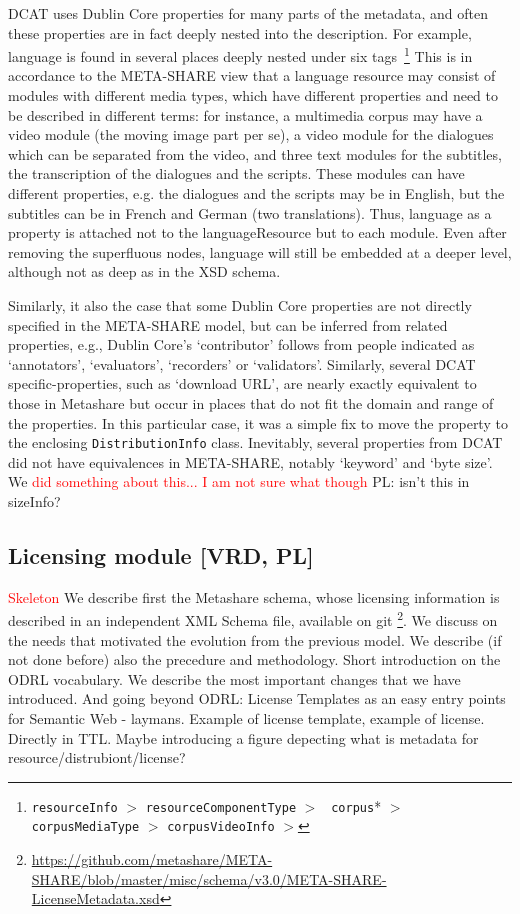 \documentclass{llncs}
\begin{document}
{DCAT uses Dublin Core properties for many parts of the metadata, and often these
properties are in fact deeply nested into the description. For example, language
is found in several places deeply nested under six
tags~\footnote{{\tt resourceInfo} $>$ {\tt resourceComponentType} $>$ {\tt
corpus}* $>$ {\tt corpusMediaType} $>$ {\tt corpusVideoInfo} $>$ {\tt}}
This is in accordance to the META-SHARE view that a language resource may consist of modules with different media types, which have different properties and need to be described in different terms: for instance, a multimedia corpus may have a video module (the moving image part per se), a video module for the dialogues which can be separated from the video, and three text modules for the subtitles, the transcription of the dialogues and the scripts. These modules can have different properties, e.g. the dialogues and the scripts may be in English, but the subtitles can be in French and German (two translations). Thus, language as a property is attached not to the languageResource but to each module. Even after removing the superfluous nodes, language will still be embedded at a deeper level, although not as deep as in the XSD schema.


Similarly, it also the case that some Dublin Core properties are not directly
specified in the META-SHARE model, but can be inferred from related properties,
e.g., Dublin Core's `contributor' follows from people indicated as `annotators',
`evaluators', `recorders' or `validators'. Similarly, several DCAT specific-properties, such as `download URL', are nearly
exactly equivalent to those in Metashare but occur in places that do not fit the
domain and range of the properties. In this particular case, it was a simple fix
to move the property to the enclosing {\tt DistributionInfo} class.
Inevitably, several properties from DCAT did not have equivalences in
META-SHARE, notably `keyword' and `byte size'. We \textcolor{red}{did something
about this... I am not sure what though}
{PL: isn't this in sizeInfo?}

\subsection{Licensing module [VRD, PL]}
\label{sec:licensing}
\textcolor{red}{Skeleton}
We describe first the Metashare schema, whose licensing information is described in an independent XML Schema file, available on git \footnote{\url{https://github.com/metashare/META-SHARE/blob/master/misc/schema/v3.0/META-SHARE-LicenseMetadata.xsd}}.
We discuss on the needs that motivated the evolution from the previous model. We describe (if not done before) also the precedure and methodology.
Short introduction on the ODRL vocabulary.
We describe the most important changes that we have introduced.
And going beyond ODRL: License Templates as an easy entry points for Semantic Web - laymans.
Example of license template, example of license. Directly in TTL. Maybe introducing a figure depecting what is metadata for resource/distrubiont/license?
}
\end{document}

